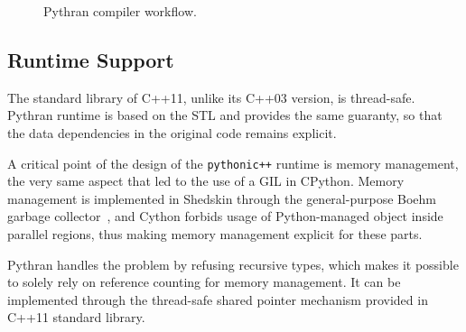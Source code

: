 \documentclass{llncs}
\begin{document}
\begin{figure}

\centering
{}
\caption{Pythran compiler workflow.}
\label{fig:pythran-compiler}
\end{figure}

\subsection{Runtime Support}

The standard library of C++11, unlike its C++03 version, is thread-safe. Pythran
runtime is based on the STL and provides the same guaranty, so that the data
dependencies in the original code remains explicit.

A critical point of the design of the \texttt{pythonic++} runtime is memory
management, the very same aspect that led to the use of a GIL in CPython.
Memory management is implemented in Shedskin through the general-purpose Boehm
garbage collector~\cite{boehm1991}, and Cython forbids usage of Python-managed
object inside parallel regions, thus making memory management explicit for these
parts.

Pythran handles the problem by refusing recursive types, which makes it possible
to solely rely on reference counting for memory management. It can be
implemented through the thread-safe shared pointer mechanism provided in C++11
standard library.
\end{document}
